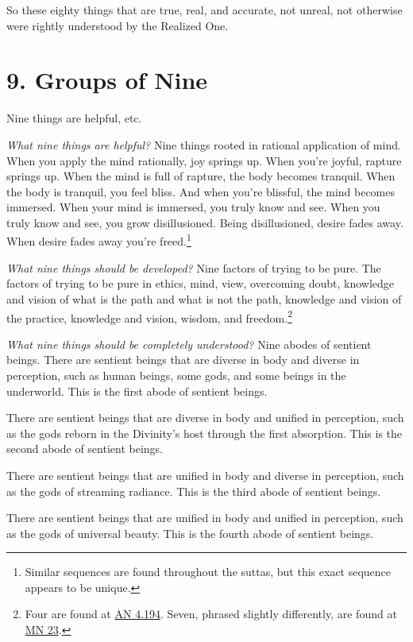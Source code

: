 \documentclass[12pt,openany]{book}%
\begin{document}
So these eighty things that are true, real, and accurate, not unreal, not otherwise were rightly understood by the Realized One. 

\section*{9. Groups of Nine }

Nine things are helpful, etc. 

\emph{What nine things are helpful?} Nine things rooted in rational application of mind. When you apply the mind rationally, joy springs up. When you’re joyful, rapture springs up. When the mind is full of rapture, the body becomes tranquil. When the body is tranquil, you feel bliss. And when you’re blissful, the mind becomes immersed. When your mind is immersed, you truly know and see. When you truly know and see, you grow disillusioned. Being disillusioned, desire fades away. When desire fades away you’re freed.\footnote{Similar sequences are found throughout the suttas, but this exact sequence appears to be unique. } 

\emph{What nine things should be developed?} Nine factors of trying to be pure. The factors of trying to be pure in ethics, mind, view, overcoming doubt, knowledge and vision of what is the path and what is not the path, knowledge and vision of the practice, knowledge and vision, wisdom, and freedom.\footnote{Four are found at \href{https://suttacentral.net/an4.194/en/sujato}{AN 4.194}. Seven, phrased slightly differently, are found at \href{https://suttacentral.net/mn23/en/sujato}{MN 23}. } 

\emph{What nine things should be completely understood?} Nine abodes of sentient beings. There are sentient beings that are diverse in body and diverse in perception, such as human beings, some gods, and some beings in the underworld. This is the first abode of sentient beings. 

There are sentient beings that are diverse in body and unified in perception, such as the gods reborn in the Divinity’s host through the first absorption. This is the second abode of sentient beings. 

There are sentient beings that are unified in body and diverse in perception, such as the gods of streaming radiance. This is the third abode of sentient beings. 

There are sentient beings that are unified in body and unified in perception, such as the gods of universal beauty. This is the fourth abode of sentient beings. 
\end{document}
